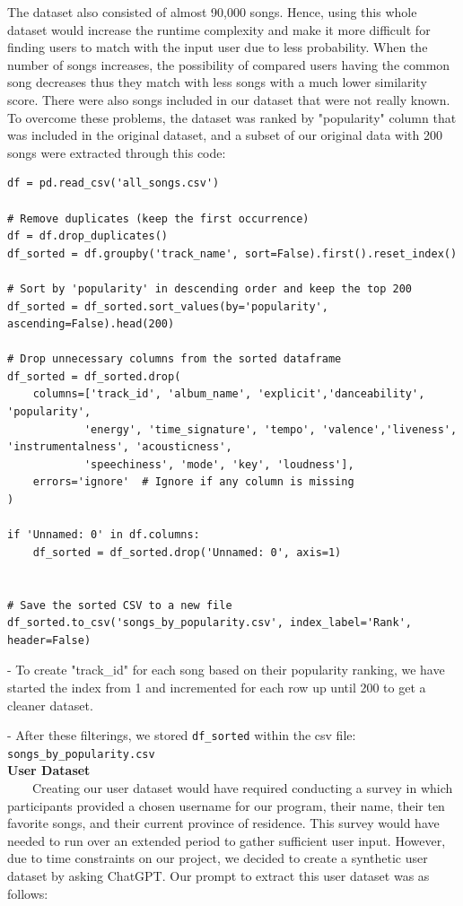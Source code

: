 \documentclass[fontsize=11pt]{article}
\numberwithin{equation}{section}
\theoremstyle{plain} %
\theoremstyle{definition}
\theoremstyle{remark}
\begin{document}
The dataset also consisted of almost 90,000 songs. Hence, using this whole dataset would increase the runtime complexity and make it more difficult for finding users to match with the input user due to less probability. When the number of songs increases, the possibility of compared users having the common song decreases thus they match with less songs with a much lower similarity score. There were also songs included in our dataset that were not really known. To overcome these problems, the dataset was ranked by "popularity" column that was included in the original dataset, and a subset of our original data with 200 songs were extracted through this code: 

\begin{verbatim}
df = pd.read_csv('all_songs.csv')

# Remove duplicates (keep the first occurrence)
df = df.drop_duplicates()
df_sorted = df.groupby('track_name', sort=False).first().reset_index()

# Sort by 'popularity' in descending order and keep the top 200
df_sorted = df_sorted.sort_values(by='popularity', ascending=False).head(200)

# Drop unnecessary columns from the sorted dataframe
df_sorted = df_sorted.drop(
    columns=['track_id', 'album_name', 'explicit','danceability', 'popularity', 
            'energy', 'time_signature', 'tempo', 'valence','liveness', 'instrumentalness', 'acousticness', 
            'speechiness', 'mode', 'key', 'loudness'],
    errors='ignore'  # Ignore if any column is missing
)

if 'Unnamed: 0' in df.columns:
    df_sorted = df_sorted.drop('Unnamed: 0', axis=1)


# Save the sorted CSV to a new file
df_sorted.to_csv('songs_by_popularity.csv', index_label='Rank', header=False)

\end{verbatim}

- To create "track\_id" for each song based on their popularity ranking, we have started the index from 1 and incremented for each row up until 200 to get a cleaner dataset.

- After these filterings, we stored \texttt{df\_sorted} within the csv file: \texttt{songs\_by\_popularity.csv}
\\

\textbf{User Dataset}
\\

$\qquad$Creating our user dataset would have required conducting a survey in which participants provided a chosen username for our program, their name, their ten favorite songs, and their current province of residence. This survey would have needed to run over an extended period to gather sufficient user input. However, due to time constraints on our project, we decided to create a synthetic user dataset by asking ChatGPT. Our prompt to extract this user dataset was as follows:
\end{document}
